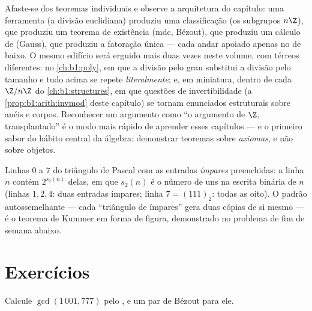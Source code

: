\begin{remark}\label{rem:b1:arith:interlude}
Afaste-se dos teoremas individuais e observe a
arquitetura do capítulo: uma ferramenta (a divisão euclidiana)
produziu uma classificação (os subgrupos $n\Z$), que produziu um
teorema de existência (mdc, Bézout), que produziu um cálculo de
 (Gauss), que produziu a fatoração única --- cada
andar apoiado apenas no de baixo. O mesmo edifício será
erguido mais duas vezes neste volume, com térreos diferentes:
no \cref{ch:b1:poly}, em que a divisão pelo grau substitui a divisão
pelo tamanho e tudo acima se repete \emph{literalmente}; e, em
miniatura, dentro de cada $\Z/n\Z$ do \cref{ch:b1:structures},
em que questões de invertibilidade (a \cref{prop:b1:arith:invmod}
deste capítulo) se tornam enunciados estruturais sobre
anéis e corpos. Reconhecer um argumento como ``o argumento de $\Z$,
transplantado'' é o modo mais rápido de aprender esses capítulos --- e
o primeiro sabor do hábito central da álgebra: demonstrar teoremas
sobre \emph{axiomas}, e não sobre objetos.
\end{remark}

\begin{omfigure}

{\small Linhas $0$ a $7$ do triângulo de Pascal com as entradas
\emph{ímpares} preenchidas: a linha $n$ contém $2^{s_2(n)}$ delas, em que
$s_2(n)$ é o número de uns na escrita binária de $n$
(linhas $1, 2, 4$: duas entradas ímpares; linha $7 = (111)_2$: todas as oito).
O padrão autossemelhante --- cada ``triângulo de ímpares'' gera duas
cópias de si mesmo --- é o teorema de Kummer em forma de figura,
demonstrado no problema de fim de semana abaixo.}
\end{omfigure}

\section{Exercícios}

\begin{exercise}[$\star$]\label{exo:b1:arith:1}
Calcule $\gcd(1\,001, 777)$ pelo , e um par de
Bézout para ele.
\end{exercise}

